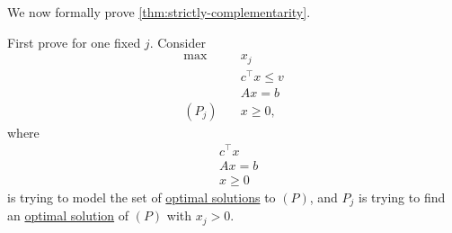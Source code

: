 We now formally prove \autoref{thm:strictly-complementarity}.
\begin{explanation}
	First prove for one fixed \(j\). Consider
	\[
		\begin{aligned}
			\max~        & x_{j}            \\
			             & c^{\top}x \leq v \\
			             & Ax = b           \\
			(P_{j})\quad & x\geq 0,
		\end{aligned}
	\]
	where
	\[
		\begin{aligned}
			 & c^{\top}x \\
			 & Ax = b    \\
			 & x\geq 0
		\end{aligned}
	\]
	is trying to model the set of \hyperref[def:optimal-solution]{optimal solutions} to \((P)\), and \(P_{j}\) is trying to find an \hyperref[def:optimal-solution]{optimal solution}
	of \((P)\) with \(x_{j}>0\).


\end{explanation}
